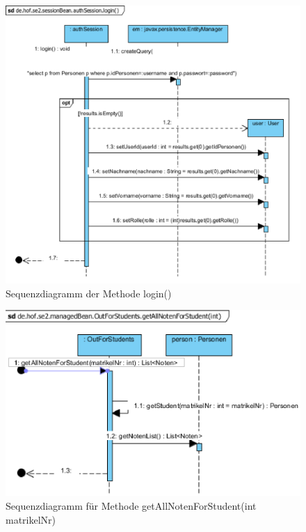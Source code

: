 \documentclass[12pt,a4paper,parskip]{scrreprt}
\begin{document}
\begin{figure}
\centering
\includegraphics[width=0.7\linewidth]{../VP/login}
\caption[Sequenzdiagramm login()]{Sequenzdiagramm der Methode login()}
\label{fig:login}
\end{figure}

\begin{figure}
\centering
\includegraphics[width=1\linewidth]{../VP/NotenStudent}
\caption[Sequenzdiagramm getAllNotenForStudent]{Sequenzdiagramm für Methode getAllNotenForStudent(int matrikelNr)}
\label{fig:NotenStudent}
\end{figure}
\listoffigures
\end{document}
